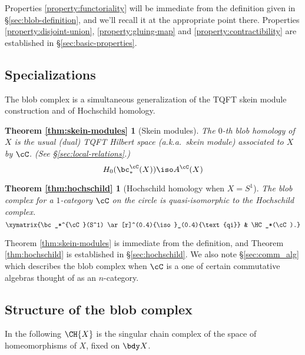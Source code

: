 Properties \ref{property:functoriality} will be immediate from the definition given in
\S \ref{sec:blob-definition}, and we'll recall it at the appropriate point there.
Properties \ref{property:disjoint-union}, \ref{property:gluing-map} and \ref{property:contractibility} are established in \S \ref{sec:basic-properties}.

\subsection{Specializations}
\label{sec:specializations}

The blob complex is a simultaneous generalization of the TQFT skein module construction and of Hochschild homology.

\newtheorem*{thm:skein-modules}{Theorem \ref{thm:skein-modules}}

\begin{thm:skein-modules}[Skein modules]
The $0$-th blob homology of $X$ is the usual 
(dual) TQFT Hilbert space (a.k.a.\ skein module) associated to $X$
by $\cC$.
(See \S \ref{sec:local-relations}.)
\begin{equation*}
H_0(\bc_*^{\cC}(X)) \iso A^{\cC}(X)
\end{equation*}
\end{thm:skein-modules}

\newtheorem*{thm:hochschild}{Theorem \ref{thm:hochschild}}

\begin{thm:hochschild}[Hochschild homology when $X=S^1$]
The blob complex for a $1$-category $\cC$ on the circle is
quasi-isomorphic to the Hochschild complex.
\begin{equation*}
\xymatrix{\bc_*^{\cC}(S^1) \ar[r]^(0.4){\iso}_(0.4){\text{qi}} & \HC_*(\cC).}
\end{equation*}
\end{thm:hochschild}

Theorem \ref{thm:skein-modules} is immediate from the definition, and
Theorem \ref{thm:hochschild} is established in \S \ref{sec:hochschild}.
We also note \S \ref{sec:comm_alg} which describes the blob complex when $\cC$ is a one of certain commutative algebras thought of as an $n$-category.


\subsection{Structure of the blob complex}
\label{sec:structure}

In the following $\CH{X}$ is the singular chain complex of the space of homeomorphisms of $X$, fixed on $\bdy X$.

